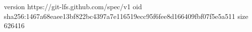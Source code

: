 version https://git-lfs.github.com/spec/v1
oid sha256:1467a68eaee13bf822bc4397a7e116519ecc95f6fee8d166409fbf07f5e5a511
size 626416
